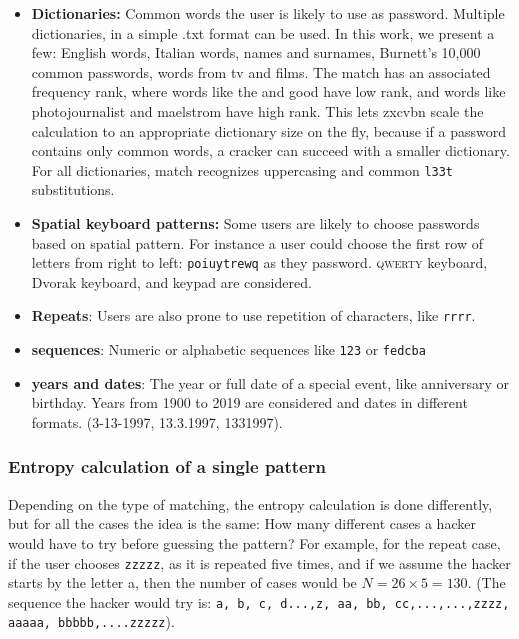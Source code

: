 \begin{itemize}
\setlength\itemsep{-3pt}


\item \textbf{Dictionaries:} Common words the user is likely to use as password. Multiple dictionaries, in a simple .txt format can be used. In this work, we present a few: English words, Italian words, names and surnames, Burnett’s 10,000 common passwords, words from tv and films. The match has an associated frequency rank, where words like the and good have low rank, and words like photojournalist and maelstrom have high rank. This lets zxcvbn scale the calculation to an appropriate dictionary size on the fly, because if a password contains only common words, a cracker can succeed with a smaller dictionary. For all dictionaries, match recognizes uppercasing and common \texttt{l33t} substitutions.

\item \textbf{Spatial keyboard patterns:} Some users are likely to choose passwords based on spatial pattern. For instance a user could choose the first row of letters from right to left: \texttt{poiuytrewq} as they password. \textsc{qwerty} keyboard, Dvorak keyboard, and keypad are considered.

\item \textbf{Repeats}: Users are also prone to use repetition of characters, like \texttt{rrrr}. 

\item \textbf{sequences}: Numeric or alphabetic sequences like \texttt{123} or \texttt{fedcba}

\item \textbf{years and dates}: The year or full date of a special event, like anniversary or birthday. Years from 1900 to 2019 are considered and dates in different formats. (3-13-1997, 13.3.1997, 1331997). 

\end{itemize}

\subsubsection*{Entropy calculation of a single pattern}
Depending on the type of matching, the entropy calculation is done differently, but for all the cases the idea is the same: How many different cases a hacker would have to try before guessing the pattern? For example, for the repeat case, if the user chooses \texttt{zzzzz}, as it is repeated five times, and if we assume the hacker starts by the letter a, then the number of cases would be $ N = 26 \times 5 = 130 $. (The sequence the hacker would try is: \texttt{a, b, c, d...,z, aa, bb, cc,...,...,zzzz, aaaaa, bbbbb,....zzzzz}).


